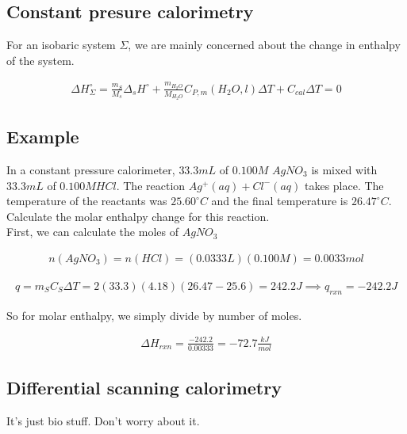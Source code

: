 \documentclass[12pt]{book}
\begin{document}
\subsection*{Constant presure calorimetry}

For an isobaric system $\Sigma$, we are mainly concerned about the change in enthalpy of the system.

\begin{align*}
    \Delta H_\Sigma^{\circ}=\frac{m_S}{M_s}\Delta_s H^{\circ}+\frac{m_{H_2O}}{M_{H_2O}}C_{P,m}(H_2O,l)\Delta T+C_{cal}\Delta T=0
\end{align*}

\subsection*{Example}

In a constant pressure calorimeter, $33.3 mL$ of $0.100 M$ $AgNO_3$ is mixed with $33.3 mL$ of $0.100 M HCl$. The
reaction $Ag^+(aq) + Cl^-(aq)$ takes place. The temperature of the reactants was $25.60 ^{\circ}C$ and the final temperature is
$26.47^{\circ}C$. Calculate the molar enthalpy change for this reaction.\\

First, we can calculate the moles of $AgNO_3$

\begin{align*}
n(AgNO_3)=n(HCl)=(0.0333L)(0.100M)=0.0033 mol
\end{align*}

\begin{align*}
    q=m_S C_S\Delta T=2(33.3)(4.18)(26.47-25.6)=242.2J\implies q_{rxn}=-242.2J
\end{align*}

So for molar enthalpy, we simply divide by number of moles.

\begin{align*}
    \Delta H_{rxn}=\frac{-242.2}{0.00333}=-72.7\frac{kJ}{mol}
\end{align*}

\subsection*{Differential scanning calorimetry}

It's just bio stuff. Don't worry about it.
\end{document}
